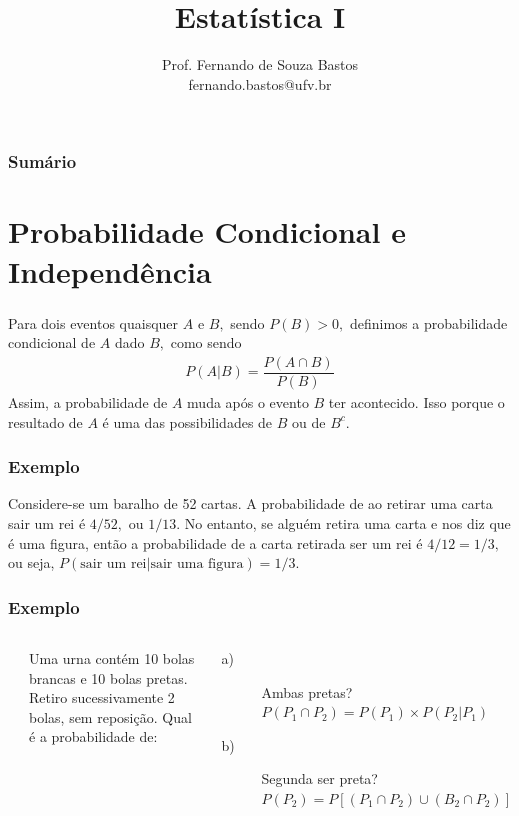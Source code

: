 \documentclass[14pt,aspectratio=1610]{beamer}
\title{Estatística I}
\author{Prof. Fernando de Souza Bastos \texorpdfstring{\\ fernando.bastos@ufv.br}{}}
\institute{Departamento de Estatística \texorpdfstring{\\ Universidade Federal de Viçosa}{}\texorpdfstring{\\ Campus UFV - Viçosa}{}}
\date{}
\begin{document}
%

\frame{\titlepage}

\begin{frame}{}
\frametitle{\bf Sumário}
\tableofcontents
\end{frame}

\section{Probabilidade Condicional e Independência}
\begin{frame}{}
\frametitle{}
\begin{block}{}
\justifying
Para dois eventos quaisquer $A$ e $B,$ sendo $P(B)>0,$ definimos a probabilidade
condicional de $A$ dado $B,$ como sendo 
\begin{align}\label{bayes}
P(A|B)=\dfrac{P(A\cap B)}{P(B)}
\end{align}
Assim, a probabilidade de $A$ muda após o evento $B$ ter acontecido. Isso porque o resultado de $A$ é uma das 
possibilidades de $B$ ou de $B^{c}.$ 
\end{block}
\end{frame}


\begin{frame}{}
\frametitle{Exemplo}
\begin{block}{}
\justifying
Considere-se um baralho de 52 cartas. A probabilidade de ao retirar uma
carta sair um rei é $4/52,$ ou $1/13.$ No entanto, se alguém retira uma
carta e nos diz que é uma figura, então a probabilidade de a carta retirada
ser um rei é $4/12=1/3,$ ou seja, $P(\textrm{sair um rei}|\textrm{sair uma
figura})=1/3.$
\end{block}
\end{frame}

\begin{frame}{}
\frametitle{Exemplo}
\begin{block}{}
\begin{columns}
        \column{5cm}
\begin{block}{}
\end{block}
        \column{10cm}
Uma urna contém 10 bolas brancas e 10 bolas pretas. Retiro sucessivamente 2 bolas, sem reposição. Qual é a probabilidade de:
\begin{description}
\item[a)] Ambas pretas?\pause\\
$P(P_{1}\cap P_{2})=P(P_{1})\times P(P_{2}|P_{1})$
\item[b)]Segunda ser preta?\pause\\
$P(P_{2})=P[(P_{1}\cap P_{2})\cup (B_{2}\cap P_{2})]$
\end{description}
\end{columns}
\end{block}     
\end{frame}
\end{document}
